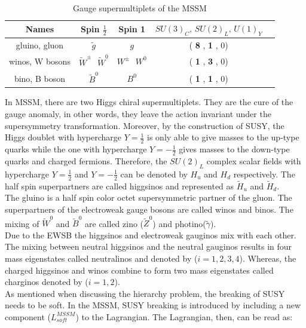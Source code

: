 \\
\begin{table}[ht]
\begin{center}
\begin{tabular}{|c|c|c|c|c|}\hline
Names    & Spin $\frac{1}{2}$    & Spin  1 & $SU(3)_C,\,SU(2)_L,\,U(1)_Y$ \\
\hline
\hline
gluino, gluon & $\tilde{g}$  &  $g$      & ( {\bf 8} , {\bf 1} , 0)\\
\hline
winos, W bosons & $\tilde{W}^{\pm}$\,\, $\tilde{W}^0$  & $ W^{\pm}$\,\, $W^0$      & ( {\bf 1} , {\bf 3} , 0) \\
\hline
bino, B boson &  $\tilde{B}^0$ &    $B^0$   & ( {\bf 1} , {\bf 1} , 0)\\
\hline
\end{tabular}
\end{center}
\caption{Gauge supermultiplets of the MSSM}\label{tab:mssmGauge}
\end{table}
\renewcommand{\arraystretch}{1}
In MSSM, there are two Higgs chiral supermultiplets. They are the cure of the gauge anomaly, in other words, they leave the action invariant under the supersymmetry transformation. Moreover, by the construction of SUSY, the Higgs doublet with hypercharge $Y=\frac{1}{2}$ is only able to give masses to the up-type quarks while the one with hypercharge $Y=-\frac{1}{2}$ gives masses to the down-type quarks and charged fermions. Therefore, the $SU(2)_L$ complex scalar fields with hypercharge $Y=\frac{1}{2}$ and $Y=-\frac{1}{2}$ can be denoted by $H_u$ and $H_d$ respectively. The half spin superpartners are called higgsinos and represented as $\tilde{H}_u$ and $\tilde{H}_d$.\\
The gluino is a half spin color octet supersymmetric partner of the gluon.  The superpartners of the electroweak gauge bosons are called winos and binos. The mixing of $\tilde{W}^0$ and $\tilde{B}^0$ are called zino ($\tilde{Z}^0$) and photino($\tilde{\gamma}$).\\
Due to the EWSB the higgsinos and electroweak gauginos mix with each other. The mixing between neutral higgsinos and the neutral gauginos results in four mass eigenstates called neutralinos and denoted by \ninoi ($i = 1, 2, 3, 4$). Whereas, the charged higgsinos and winos combine to form two mass eigenstates called charginos denoted by \chipmi ($i = 1, 2$).\\
As mentioned when discussing the hierarchy problem, the breaking of SUSY needs to be soft. In the MSSM, SUSY breaking is introduced by including a new component ($L^{MSSM}_{soft}$) to the Lagrangian. The Lagrangian, then, can be read as:
